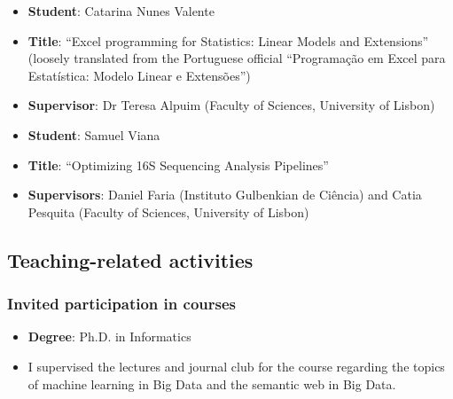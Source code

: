 \begin{itemize}
    \item \textbf{Student}: Catarina Nunes Valente
    \item \textbf{Title}: ``Excel programming for Statistics: Linear Models and Extensions'' (loosely translated from the Portuguese official ``Programação em Excel para Estatística: Modelo Linear e Extensões'')
    \item \textbf{Supervisor}: Dr Teresa Alpuim (Faculty of Sciences, University of Lisbon)
\end{itemize}

\begin{itemize}
    \item \textbf{Student}: Samuel Viana
    \item \textbf{Title}: ``Optimizing 16S Sequencing Analysis Pipelines''
    \item \textbf{Supervisors}: Daniel Faria (Instituto Gulbenkian de Ciência) and Catia Pesquita (Faculty of Sciences, University of Lisbon)
\end{itemize}


\subsection{Teaching-related activities}

\subsubsection{Invited participation in courses}

\begin{itemize}
    \item \textbf{Degree}: Ph.D. in Informatics
    \item I supervised the lectures and journal club for the course regarding the topics of machine learning in Big Data and the semantic web in Big Data.
\end{itemize}

